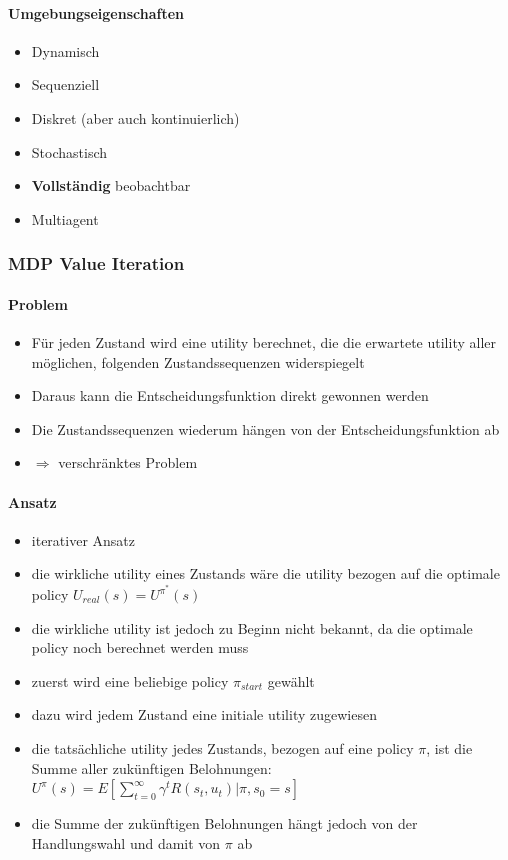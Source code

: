 \paragraph{Umgebungseigenschaften}
\begin{itemize}
	\item Dynamisch
	\item Sequenziell
	\item Diskret (aber auch kontinuierlich)
	\item Stochastisch
	\item \textbf{Vollst\"andig} beobachtbar
	\item Multiagent
\end{itemize}

\subsubsection{MDP Value Iteration}

\paragraph{Problem}
\begin{itemize}
	\item F\"ur jeden Zustand wird eine utility berechnet, die die erwartete utility aller m\"oglichen, folgenden Zustandssequenzen widerspiegelt
	\item Daraus kann die Entscheidungsfunktion direkt gewonnen werden
	\item Die Zustandssequenzen wiederum h\"angen von der Entscheidungsfunktion ab
	\item $\Rightarrow$ verschr\"anktes Problem
\end{itemize}

\paragraph{Ansatz}
\begin{itemize}
	\item iterativer Ansatz
	\item die wirkliche utility eines Zustands w\"are die utility bezogen auf die optimale policy $U_{real}(s) = U^{\pi^*}(s)$
	\item die wirkliche utility ist jedoch zu Beginn nicht bekannt, da die optimale policy noch berechnet werden muss
	\item zuerst wird eine beliebige policy $\pi_{start}$ gew\"ahlt
	\item dazu wird jedem Zustand eine initiale utility zugewiesen
	\item die tats\"achliche utility jedes Zustands, bezogen auf eine policy $\pi$, ist die Summe aller zuk\"unftigen Belohnungen:
	$U^{\pi}(s) = E \left[ \sum_{t = 0}^{\infty} \gamma^t R(s_t, u_t) | \pi, s_0 = s \right]$
	\item die Summe der zuk\"unftigen Belohnungen h\"angt jedoch von der Handlungswahl und damit von $\pi$ ab
\end{itemize}

